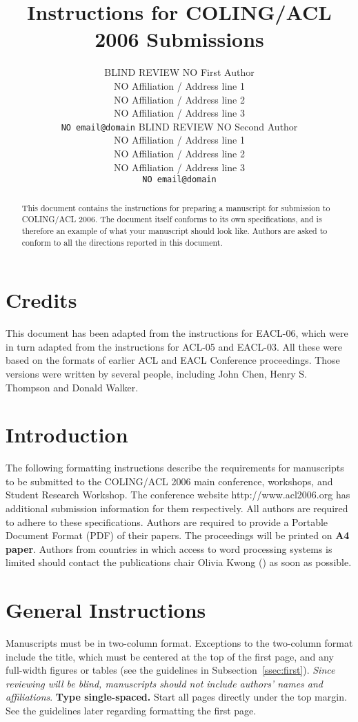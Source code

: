 \documentclass[11pt]{article}
\title{Instructions for COLING/ACL 2006 Submissions}
\author{BLIND REVIEW NO First Author\\
  NO Affiliation / Address line 1\\
  NO Affiliation / Address line 2\\
  NO Affiliation / Address line 3\\
  {\tt NO email@domain}  \And
  BLIND REVIEW NO Second Author\\
  NO Affiliation / Address line 1\\
  NO Affiliation / Address line 2\\
  NO Affiliation / Address line 3\\
  {\tt NO email@domain}}
\date{}
\begin{document}
\maketitle
\begin{abstract}
This document contains the instructions for preparing a manuscript for submission to COLING/ACL 2006. The document itself conforms to its own specifications, and is therefore an example of what your manuscript should look like. Authors are asked to conform to all the directions reported in this document.
\end{abstract}

\section{Credits}

This document has been adapted from the instructions for EACL-06, which were in turn adapted from the instructions for ACL-05 and EACL-03.  All these were based on the formats of earlier ACL and EACL Conference proceedings.  Those versions were written by several people, including John Chen, Henry S. Thompson and Donald Walker.

\section{Introduction}

The following formatting instructions describe the requirements for manuscripts to be submitted to the COLING/ACL 2006 main conference, workshops, and Student Research Workshop. The conference website http://www.acl2006.org has additional submission information for them respectively. All authors are required to adhere to these specifications. Authors are required to provide a Portable Document Format (PDF) of their papers. The proceedings will be printed on \textbf{A4 paper}. Authors from countries in which access to word processing systems is limited should contact the publications chair Olivia Kwong () as soon as possible.


\section{General Instructions}

Manuscripts must be in two-column format.  Exceptions to the two-column format include the title, which must be centered at the top of the first page, and any full-width figures or tables (see the guidelines in Subsection~\ref{ssec:first}).  \textit{Since reviewing will be blind, manuscripts should not include authors' names and affiliations}.  \textbf{Type single-spaced.}  Start all pages directly under the top margin. See the guidelines later regarding formatting the first page.
\end{document}
